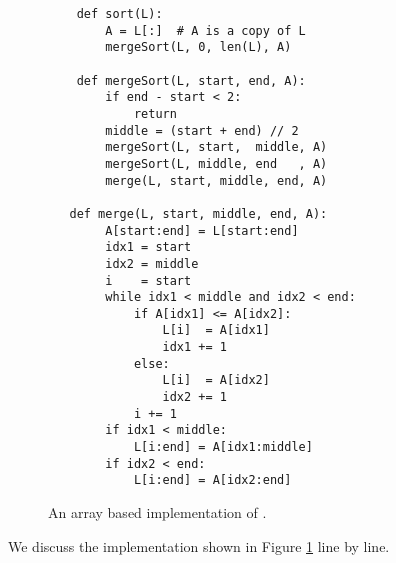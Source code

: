 \begin{figure}[!ht]
  \centering
\begin{verbatim}
    def sort(L):
        A = L[:]  # A is a copy of L
        mergeSort(L, 0, len(L), A)
    
    def mergeSort(L, start, end, A):
        if end - start < 2:
            return
        middle = (start + end) // 2
        mergeSort(L, start,  middle, A)
        mergeSort(L, middle, end   , A)
        merge(L, start, middle, end, A)
    
   def merge(L, start, middle, end, A):
        A[start:end] = L[start:end]
        idx1 = start
        idx2 = middle
        i    = start
        while idx1 < middle and idx2 < end:
            if A[idx1] <= A[idx2]:
                L[i]  = A[idx1]
                idx1 += 1
            else:
                L[i]  = A[idx2]
                idx2 += 1
            i += 1
        if idx1 < middle:
            L[i:end] = A[idx1:middle]
        if idx2 < end:
            L[i:end] = A[idx2:end]
\end{verbatim}
\vspace*{-0.3cm}
  \caption{An array based implementation of .}
  \label{fig:merge-sort-array.stlx}
\end{figure}
We discuss the implementation shown in Figure \ref{fig:merge-sort-array.stlx} line by line.
